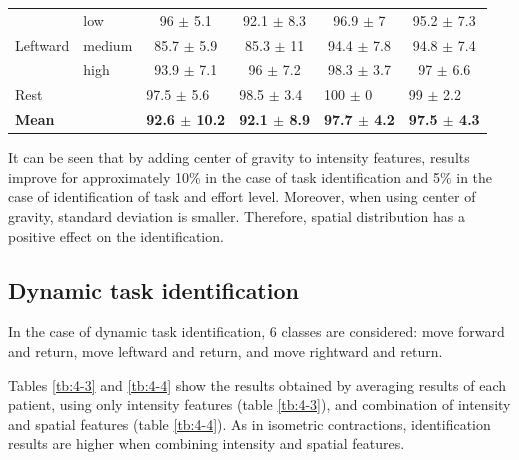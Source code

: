 \begin{table}[]
\begin{tabular}{llcccc}
              & low            & 96 $\pm$ 5.1                                  & 92.1 $\pm$ 8.3                               & 96.9 $\pm$ 7                                & 95.2 $\pm$ 7.3                              \\
Leftward      & medium         & 85.7 $\pm$ 5.9                                & 85.3 $\pm$ 11                                & 94.4 $\pm$ 7.8                              & 94.8 $\pm$ 7.4                              \\
              & high           & 93.9 $\pm$ 7.1                                & 96 $\pm$ 7.2                                 & 98.3 $\pm$ 3.7                              & 97 $\pm$ 6.6                                \\ \hline
Rest          &                & \multicolumn{1}{l}{97.5 $\pm$ 5.6}            & \multicolumn{1}{l}{98.5 $\pm$ 3.4}           & \multicolumn{1}{l}{100 $\pm$ 0}             & \multicolumn{1}{l}{99 $\pm$ 2.2}            \\
\textbf{Mean} & \textbf{}      & \multicolumn{1}{l}{\textbf{92.6  $\pm$ 10.2}} & \multicolumn{1}{l}{\textbf{92.1  $\pm$ 8.9}} & \multicolumn{1}{l}{\textbf{97.7 $\pm$ 4.2}} & \multicolumn{1}{l}{\textbf{97.5 $\pm$ 4.3}}
\end{tabular}
\end{table}

It can be seen that by adding center of gravity to intensity features, results improve for approximately 10\% in the case of task identification and 5\% in the case of identification of task and effort level. Moreover, when using center of gravity, standard deviation is smaller. Therefore, spatial distribution has a positive effect on the identification.


\subsection{Dynamic task identification}
In the case of dynamic task identification, 6 classes are considered: move forward and return, move leftward and return, and move rightward and return.

Tables \ref{tb:4-3} and \ref{tb:4-4} show the results obtained by averaging results of each patient, using only intensity features (table \ref{tb:4-3}), and combination of intensity and spatial features (table \ref{tb:4-4}). As in isometric contractions, identification results are higher when combining intensity and spatial features.

